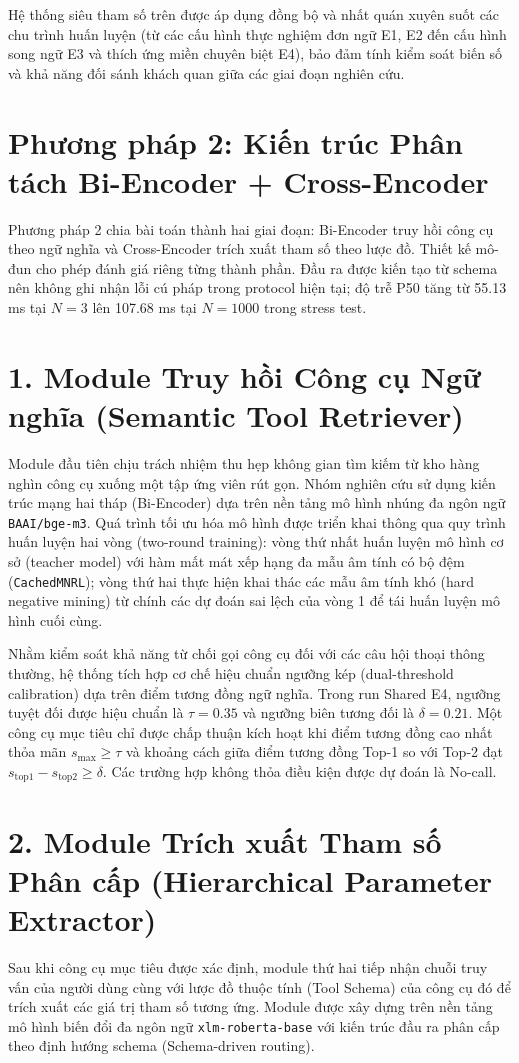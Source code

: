 Hệ thống siêu tham số trên được áp dụng đồng bộ và nhất quán xuyên suốt các chu trình huấn luyện (từ các cấu hình thực nghiệm đơn ngữ E1, E2 đến cấu hình song ngữ E3 và thích ứng miền chuyên biệt E4), bảo đảm tính kiểm soát biến số và khả năng đối sánh khách quan giữa các giai đoạn nghiên cứu.

\section{Phương pháp 2: Kiến trúc Phân tách Bi-Encoder + Cross-Encoder}

Phương pháp 2 chia bài toán thành hai giai đoạn: Bi-Encoder truy hồi công cụ theo ngữ nghĩa và Cross-Encoder trích xuất tham số theo lược đồ. Thiết kế mô-đun cho phép đánh giá riêng từng thành phần. Đầu ra được kiến tạo từ schema nên không ghi nhận lỗi cú pháp trong protocol hiện tại; độ trễ P50 tăng từ 55.13 ms tại $N=3$ lên 107.68 ms tại $N=1000$ trong stress test.

\section{1. Module Truy hồi Công cụ Ngữ nghĩa (Semantic Tool Retriever)}
Module đầu tiên chịu trách nhiệm thu hẹp không gian tìm kiếm từ kho hàng nghìn công cụ xuống một tập ứng viên rút gọn. Nhóm nghiên cứu sử dụng kiến trúc mạng hai tháp (Bi-Encoder) dựa trên nền tảng mô hình nhúng đa ngôn ngữ \texttt{BAAI/bge-m3}. Quá trình tối ưu hóa mô hình được triển khai thông qua quy trình huấn luyện hai vòng (two-round training): vòng thứ nhất huấn luyện mô hình cơ sở (teacher model) với hàm mất mát xếp hạng đa mẫu âm tính có bộ đệm (\texttt{CachedMNRL}); vòng thứ hai thực hiện khai thác các mẫu âm tính khó (hard negative mining) từ chính các dự đoán sai lệch của vòng 1 để tái huấn luyện mô hình cuối cùng.

Nhằm kiểm soát khả năng từ chối gọi công cụ đối với các câu hội thoại thông thường, hệ thống tích hợp cơ chế hiệu chuẩn ngưỡng kép (dual-threshold calibration) dựa trên điểm tương đồng ngữ nghĩa. Trong run Shared E4, ngưỡng tuyệt đối được hiệu chuẩn là $\tau = 0.35$ và ngưỡng biên tương đối là $\delta = 0.21$. Một công cụ mục tiêu chỉ được chấp thuận kích hoạt khi điểm tương đồng cao nhất thỏa mãn $s_{\max} \ge \tau$ và khoảng cách giữa điểm tương đồng Top-1 so với Top-2 đạt $s_{\text{top1}} - s_{\text{top2}} \ge \delta$. Các trường hợp không thỏa điều kiện được dự đoán là No-call.

\section{2. Module Trích xuất Tham số Phân cấp (Hierarchical Parameter Extractor)}
Sau khi công cụ mục tiêu được xác định, module thứ hai tiếp nhận chuỗi truy vấn của người dùng cùng với lược đồ thuộc tính (Tool Schema) của công cụ đó để trích xuất các giá trị tham số tương ứng. Module được xây dựng trên nền tảng mô hình biến đổi đa ngôn ngữ \texttt{xlm-roberta-base} với kiến trúc đầu ra phân cấp theo định hướng schema (Schema-driven routing).

